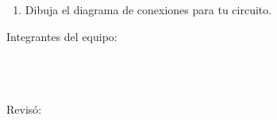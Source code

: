 	\begin{enumerate}
		\item Dibuja el diagrama de conexiones para tu circuito. \newline \newline \newline \newline \newline \newline \newline \newline \newline \newline \newline \newline \newline \newline \newline \newline \newline \newline \newline \newline \newline \newline \newline \newline \newline \newline \newline \newline
	\end{enumerate}

	Integrantes del equipo: \\[0.2cm]
	\horrule{0.5pt} \\[0.2cm] %
	\horrule{0.5pt} \\[0.2cm] %
	\horrule{0.5pt} \\[0.2cm] %
	\horrule{0.5pt} %

	Revisó: \\[0.2cm]
	\horrule{0.5pt} \\%



